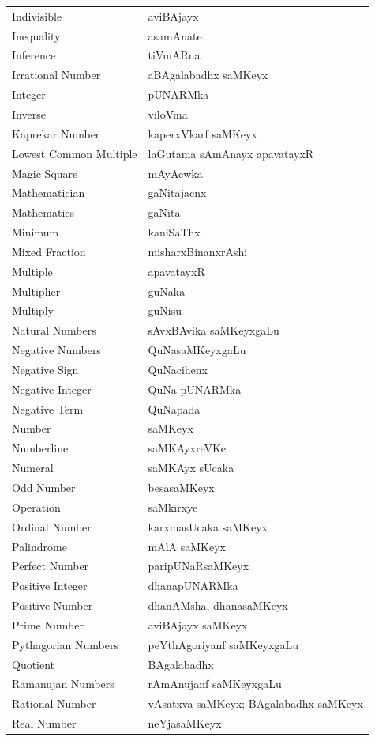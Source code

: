 \begin{longtable}{>{\rm}l@{\hspace{1.25cm}}l}
Indivisible & aviBAjayx\\
Inequality & asamAnate\\
Inference & tiVmARna\\
Irrational Number & aBAgalabadhx saMKeyx\\
Integer & pUNARMka\\
Inverse & viloVma\\
Kaprekar Number & kaperxVkarf saMKeyx\\
Lowest Common Multiple & laGutama sAmAnayx apavatayxR\\
Magic Square & mAyAcwka\\
Mathematician & gaNitajacnx\\
Mathematics & gaNita\\
Minimum & kaniSaThx\\
Mixed Fraction & misharxBinanxrAshi\\
Multiple & apavatayxR\\
Multiplier & guNaka\\
Multiply & guNisu\\
Natural Numbers & sAvxBAvika saMKeyxgaLu\\
Negative Numbers & QuNasaMKeyxgaLu\\
Negative Sign & QuNacihenx\\
Negative Integer & QuNa pUNARMka\\
Negative Term & QuNapada\\
Number & saMKeyx\\
Numberline & saMKAyxreVKe\\
Numeral & saMKAyx sUcaka\\
Odd Number & besasaMKeyx\\
Operation & saMkirxye\\
Ordinal Number & karxmasUcaka saMKeyx\\
Palindrome & mAlA saMKeyx\\
Perfect Number & paripUNaRsaMKeyx\\
Positive Integer & dhanapUNARMka\\
Positive Number & dhanAMsha, dhanasaMKeyx\\
Prime Number & aviBAjayx saMKeyx\\
Pythagorian Numbers  & peYthAgoriyanf saMKeyxgaLu\\
Quotient & BAgalabadhx\\
Ramanujan Numbers & rAmAnujanf saMKeyxgaLu\\
Rational Number & vAsatxva saMKeyx; BAgalabadhx saMKeyx\\
Real Number & neYjasaMKeyx\\

\end{longtable}
